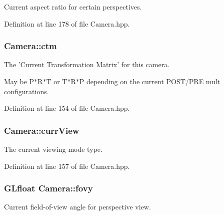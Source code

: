 \-Current aspect ratio for certain perspectives. 



\-Definition at line 178 of file \-Camera.\-hpp.

\hypertarget{class_camera_a9b1e81e3f5531390bb6a599dca0d2444}{
\subsubsection[{ctm}]{ {\bf \-Camera\-::ctm}}}\label{class_camera_a9b1e81e3f5531390bb6a599dca0d2444}


\-The '\-Current \-Transformation \-Matrix' for this camera. 

\-May be \-P$\ast$\-R$\ast$\-T or \-T$\ast$\-R$\ast$\-P depending on the current \-P\-O\-S\-T/\-P\-R\-E mult configurations. 

\-Definition at line 154 of file \-Camera.\-hpp.

\hypertarget{class_camera_a1fe2ef68d26bb98f0aa736948304eb64}{
\subsubsection[{curr\-View}]{ {\bf \-Camera\-::curr\-View}}}\label{class_camera_a1fe2ef68d26bb98f0aa736948304eb64}


\-The current viewing mode type. 



\-Definition at line 157 of file \-Camera.\-hpp.

\hypertarget{class_camera_acc8b97facc57059530efad534c2f8314}{
\subsubsection[{fovy}]{\setlength{\rightskip}{0pt plus 5cm}\-G\-Lfloat {\bf \-Camera\-::fovy}}}\label{class_camera_acc8b97facc57059530efad534c2f8314}


\-Current field-\/of-\/view angle for perspective view. 



